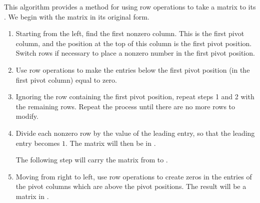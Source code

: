 \begin{algorithm}
\caption{\RREF Algorithm}
\label{algo:rrefalgorithm}

This algorithm provides a method for using row operations to take a matrix to 
its \rref {}.
We begin with the matrix in its original form. 

\begin{enumerate}
\item Starting from the left, find the first nonzero column. This is the first pivot
column, and the position at the top of this column is the first pivot
position. Switch rows if necessary to place a nonzero number in the first
pivot position.

\item Use row operations to make the entries below the first pivot
position (in the first pivot column) equal to zero.

\item  Ignoring the row containing the first pivot position, repeat steps 1 and 2 with the remaining rows. 
Repeat the process until there are no more rows
to modify. 

\item Divide each nonzero row by the value of the leading entry, so that the leading entry becomes $1$. The matrix will then be in \ef.

The following step will carry the matrix from \ef \;to \rref. 


\item Moving from right to left, use row operations to create zeros in the entries of the pivot columns which are above the pivot positions. The result
will be a matrix in \rref.
\end{enumerate}

\end{algorithm}

